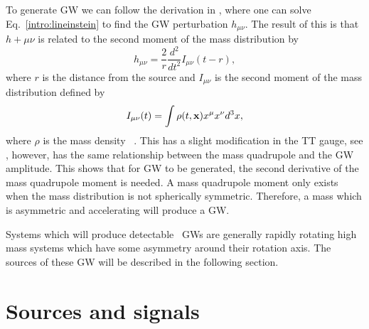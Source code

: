 To generate \gls{GW} we can follow the derivation in \citep{flanagan2005BasicsGravitational}, where one can solve Eq.~\ref{intro:lineinstein} to find the \gls{GW} perturbation $h_{\mu \nu}$.
The result of this is that $h+{\mu \nu}$ is related to the second moment of the mass distribution by
\begin{equation}
    \label{intro:gravwave:amp}
        h_{\mu \nu} = \frac{2}{r}  \frac{d^2}{dt^2} I_{\mu \nu}(t-r),
\end{equation}
where $r$ is the distance from the source \citep{letiec2016TheoryGravitational} and $I_{\mu \nu}$ is the second moment of the mass distribution defined by 
\begin{equation}
    I_{\mu \nu}(t) = \int \rho(t,{\bf x}) x^\mu x^\nu d^3x,
\end{equation}
where $\rho$ is the mass density ~\citep{flanagan2005BasicsGravitational}.  
This has a slight modification in the TT gauge, see
\citep{flanagan2005BasicsGravitational}, however, has the same relationship
between the mass quadrupole and the \gls{GW} amplitude.  This shows that for
\gls{GW} to be generated, the second derivative of the mass quadrupole moment
is needed.  A mass quadrupole moment only exists when the mass distribution is
not spherically symmetric.  Therefore, a mass which is asymmetric and
accelerating will produce a \gls{GW}.~

Systems which will produce detectable~
\glspl{GW} are generally rapidly rotating high~ mass systems which have some
asymmetry around their rotation axis.  The sources of these \gls{GW} will be
described in the following section.~



\section{\label{intro:sources}Sources and signals}


